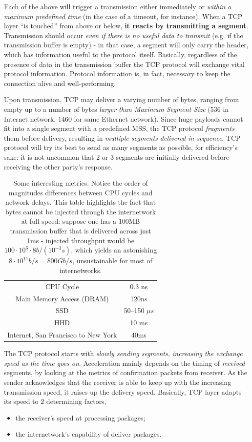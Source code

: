 \documentclass[10pt]{extreport}
\begin{document}
Each of the above will trigger a transmission either immediately or
\emph{within a maximum predefined time} (in the case of a timeout, for
instance). When a TCP layer ``is touched'' from above or below, \textbf{it reacts
by transmitting a segment}. Transmission should occur \emph{even if there is no
useful data to transmit} (e.g. if the transmission buffer is empty) \-- in that
case, a segment will only carry the header, which has information useful to the
protocol itself. Basically, regardless of the presence of data in the
transmission buffer the TCP protocol will exchange vital protocol information.
Protocol information is, in fact, necessary to keep the connection alive and
well-performing.

Upon transmission, TCP may deliver a varying number of bytes, ranging from
empty up to a number of bytes \emph{larger than Maximum Segment Size} (536 in
Internet network, 1460 for same Ethernet network). Since huge payloads cannot
fit into a single segment with a predefined MSS, the TCP protocol
\emph{fragments} them before delivery, resulting in \emph{multiple segments
delivered in sequence}. TCP protocol will try its best to send as many segments
as possible, for efficiency's sake: it is not uncommon that $2$ or $3$ segments
are initially delivered before receiving the other party's response.

\begin{table}[ht]
\centering
\begin{tabular}{cc}
CPU Cycle & 0.3 ns \\
Main Memory Access (DRAM) & 120ns \\
SSD & 50--150 $\mu s$ \\
HHD & 10 ms \\
Internet, San Francisco to New York & 40ms
\end{tabular}
\caption{Some interesting metrics. Notice the order of magnitudes differences
between CPU cycles and network delays. This table highlights the fact that
bytes cannot be injected through the internetwork at full\--speed: suppose one
has a 100MB transmission buffer that is delivered across just 1ms \--
injected throughput would be $100 \cdot 10^6 \cdot 8 b/(10^{-3} s)$, which
yields an astonishing $8 \cdot 10^{11} b/s = 800 Gb/s$, unsustainable for most
of internetworks.}
\label{tab:SomeMetrics}
\end{table}
\bigskip

The TCP protocol starts with \emph{slowly sending segments, increasing the exchange
speed as the time goes on}. Acceleration mainly depends on the timing of
\emph{received} segments, by looking at the metrics of confirmation packets
from receiver. As the sender acknowledges that the receiver is able to keep up
with the increasing transmission speed, it raises up the delivery speed. Basically, TCP layer adapts its speed to $2$ determining factors,
\begin{itemize}
    \item the receiver's speed at processing packages;
    \item the internetwork's capability of deliver packages.
\end{itemize}
\end{document}
